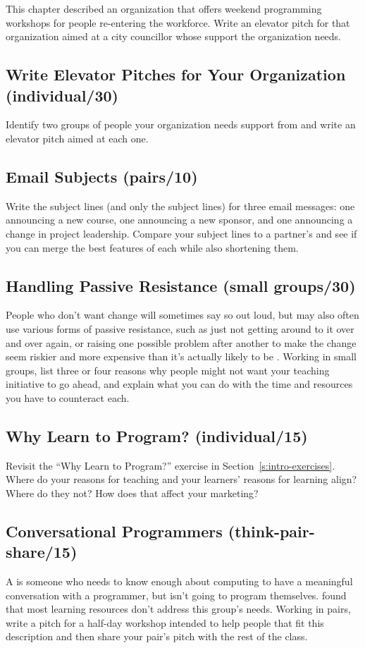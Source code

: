 This chapter described an organization
that offers weekend programming workshops for people re-entering the workforce.
Write an elevator pitch for that organization
aimed at a city councillor whose support the organization needs.

\subsection*{Write Elevator Pitches for Your Organization (individual/30)}

Identify two groups of people your organization needs support from
and write an elevator pitch aimed at each one.

\subsection*{Email Subjects (pairs/10)}

Write the subject lines (and only the subject lines) for three email messages:
one announcing a new course,
one announcing a new sponsor,
and one announcing a change in project leadership.
Compare your subject lines to a partner's
and see if you can merge the best features of each while also shortening them.

\subsection*{Handling Passive Resistance (small groups/30)}

People who don't want change will sometimes say so out loud,
but may also often use various forms of passive resistance,
such as just not getting around to it over and over again,
or raising one possible problem after another
to make the change seem riskier and more expensive than it's actually likely to be
\cite{Scot1987}.
Working in small groups,
list three or four reasons why people might not want your teaching initiative to go ahead,
and explain what you can do with the time and resources you have to counteract each.

\subsection*{Why Learn to Program? (individual/15)}

Revisit the ``Why Learn to Program?'' exercise in Section~\ref{s:intro-exercises}.
Where do your reasons for teaching and your learners' reasons for learning align?
Where do they not?
How does that affect your marketing?

\subsection*{Conversational Programmers (think-pair-share/15)}

A 
is someone who needs to know enough about computing
to have a meaningful conversation with a programmer,
but isn't going to program themselves.
\cite{Wang2018} found that most learning resources don't address this group's needs.
Working in pairs,
write a pitch for a half-day workshop intended to help people that fit this description
and then share your pair's pitch with the rest of the class.
